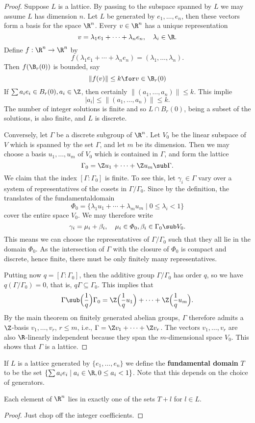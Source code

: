 \begin{proof}
Suppose $L$ is a lattice. By passing to the subspace spanned by $L$ we may assume $L$ has dimension $n$. Let $L$ be generated by $e_1,\dots,e_n$, then these vectors form a basis for the space $\R^n$. Every $v\in\R^n$ has a unique representation
\[v=\lambda_1e_1+\cdots+\lambda_ne_n,\quad\lambda_i\in\R.\]
Define $f:\R^n\to\R^n$ by
\[f(\lambda_1e_1+\cdots+\lambda_ne_n)=(\lambda_1,\dots,\lambda_n).\]
Then $f(\B_r(0))$ is bounded, say
\[\|f(v)\|\leq k\for v\in\B_r(0)\]
If $\sum a_ie_i\in B_r(0),a_i\in\Z$, then certainly $\|(a_1,\dots,a_n)\|\leq k$. This implie 
\[|a_i|\leq\|(a_1,\dots,a_n)\|\leq k.\]
The number of integer solutions is finite and so $L\cap B_r(0)$, being a subset of the solutions, is also finite, and $L$ is discrete.\par
Conversely, let $\Gamma$ be a discrete subgroup of $\R^n$. Let $V_0$ be the linear subspace of $V$ which is spanned by the set $\Gamma$, and let $m$ be its dimension. 
Then we may choose a basis $u_1,\dots,u_m$ of $V_0$ which is contained in $\Gamma$, and form the lattice
\[\Gamma_0=\Z u_1+\cdots+\Z u_m\sub\Gamma.\]
We claim that the index $[\Gamma:\Gamma_0]$ is finite. To see this, let $\gamma_i\in\Gamma$ vary over a system of representatives of the cosets in $\Gamma/\Gamma_0$. 
Since by the definition, the translates of the fundamentaldomain
\[\varPhi_0=\{\lambda_1u_1+\cdots+\lambda_mu_m\mid 0\leq\lambda_i<1\}\]
cover the entire space $V_0$. We may therefore write
\[\gamma_i=\mu_i+\beta_i,\quad \mu_i\in\varPhi_0,\beta_i\in\Gamma_0\sub V_0.\]
This means we can choose the representatives of $\Gamma/\Gamma_0$ such that they all lie in the domain $\varPhi_0$. As the intersection of $\Gamma$ with the 
closure of $\varPhi_0$ is compact and discrete, hence finite, there must be only finitely many representatives.\par
Putting now $q=[\Gamma:\Gamma_0]$, then the additive group $\Gamma/\Gamma_0$ has order $q$, so we have $q(\Gamma/\Gamma_0)=0$, that is, $q\Gamma\subseteq\Gamma_0$. 
This implies that
\[\Gamma\sub\Big(\frac{1}{q}\Big)\Gamma_0=\Z\Big(\frac{1}{q}u_1\Big)+\cdots+\Z\Big(\frac{1}{q}u_m\Big).\]
By the main theorem on finitely generated abelian groups, $\Gamma$ therefore admits a $\Z$-basis $v_1,\dots,v_r$, $r\leq m$, i.e., $\Gamma=\Z v_1+\cdots+\Z v_r$. The
vectors $v_1,\dots,v_r$ are also $\R$-linearly independent because they span the $m$-dimensional space $V_0$. This shows that $\Gamma$ is a lattice.
\end{proof}
If $L$ is a lattice generated by $\{e_1,\dots,e_n\}$ we define the \textbf{fundamental domain} $T$ to be the set $\{\sum a_ie_i\mid a_i\in\R,0\leq a_i<1\}$. Note that this depends on the choice of generators.
\begin{lemma}
Each element of $\R^n$ lies in exactly one of the sets $T+l$ for $l\in L$.
\end{lemma}
\begin{proof}
Just chop off the integer coefficients.
\end{proof}
